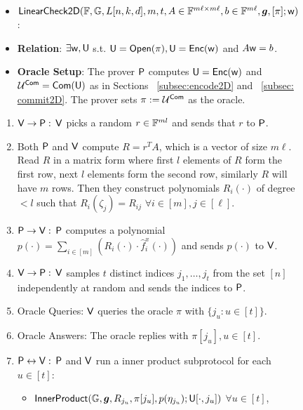 \begin{figure}[h!]
	\centering
	\begin{framed}
		\begin{itemize}
			\item {$\mathsf{LinearCheck2D} (\mathbb{F}, \mathbb{G}, L[n,k,d], m, t, A \in \mathbb{F}^{m\ell \times m\ell}, b\in \mathbb{F}^{m\ell}, \bm{g}, [\pi]; \mathsf{w})$}:
			
			\item {\bf Relation}: $\exists \mathsf{w}, \mathsf{U}$ s.t. $\mathsf{U} = \mathsf{Open}(\pi), \mathsf{U} = \mathsf{Enc}(\mathsf{w})$ and $A\mathsf{w} = b$. 
			
			\item {\bf Oracle Setup}: The prover $\mathsf{P}$ computes $\mathsf{U} = \mathsf{Enc}(\mathsf{w})$ and $\mathcal{U}^{\mathsf{Com}} = \mathsf{Com}(\mathsf{U})$ as in Sections ~\ref{subsec:encode2D} and ~\ref{subsec: commit2D}. The prover sets $\pi := \mathcal{U}^{\mathsf{Com}}$ as the oracle.
		\end{itemize}
		\begin{enumerate}[{\rm 1.}]
			\item $\mathsf{V} \rightarrow \mathsf{P}: $ $\mathsf{V}$ picks a random $r\in \mathbb{F}^{ml}$ and sends that $r$ to $\mathsf{P}$.
			
			\item Both $\mathsf{P}$ and $\mathsf{V}$ compute $R=r^TA$, which is a vector of size $m\ell$. Read $R$ in a matrix form where first $l$ elements of $R$ form the first row, next $l$ elements form the second row, similarly $R$ will have $m$ rows. Then they construct polynomials $R_i(\cdot)$ of degree $<l$ such that $R_i(\zeta_j)=R_{ij}$ $\forall i\in [m], j\in [\ell]$. 
			
			\item $\mathsf{P} \rightarrow \mathsf{V}: $  $\mathsf{P}$ computes a polynomial $p(\cdot)=\sum_{i\in[m]} ( R_i(\cdot)\cdot \hat{f}^x_i(\cdot))$ and sends $p(\cdot)$ to $\mathsf{V}$.
			
			\item $\mathsf{V} \rightarrow \mathsf{P}: $ $\mathsf{V}$ samples $t$ distinct  indices $j_1,\ldots,j_t$ from the set $[n]$ independently at random and sends the indices to $\mathsf{P}$.
			
			\item Oracle Queries: $\mathsf{V}$ queries the oracle $\pi$ with $\{j_u : u\in [t]\}$.
			
			\item Oracle Answers: The oracle replies with $\pi[j_u], u\in [t]$.
			
			\item $\mathsf{P} \leftrightarrow \mathsf{V}: $ $\mathsf{P}$ and $\mathsf{V}$ run a inner product subprotocol for each $u\in[t]$:
			\begin{itemize}
				\item $\mathsf{InnerProduct}(\mathbb{G},\bm{g}, R_{j_u}, \pi[j_u], p(\eta_{j_u}); \mathsf{U}[\cdot,j_u])$ $\forall u\in [t]$,
				

\end{itemize}
\end{enumerate}
\end{framed}
\end{figure}
